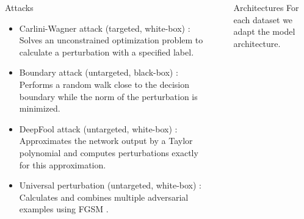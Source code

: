 \documentclass[final]{beamer}
\newlength{\sepwid}
\newlength{\onecolwid}
\newlength{\twocolwid}
\begin{document}
\begin{frame}[t]
\begin{columns}[t]
\begin{column}{\onecolwid}
			\begin{block}{Attacks}
				\begin{itemize}
					\item Carlini-Wagner attack (targeted, white-box) \cite{carlini}: Solves an unconstrained optimization problem to calculate a perturbation with a specified label.
					\item Boundary attack (untargeted, black-box) \cite{boundary}: Performs a random walk close to the
					decision boundary while the norm of the perturbation is minimized.
					\item DeepFool attack (untargeted, white-box) \cite{deepfool}: Approximates the network output by a Taylor polynomial and computes perturbations exactly for this approximation.
					\item Universal perturbation (untargeted, white-box) \cite{universal}: Calculates and combines multiple adversarial examples using FGSM \cite{fgsm}.
				\end{itemize}
			\end{block}
			
			
			
		\end{column} %
		
		\begin{column}{\sepwid}\end{column} %
		
		\begin{column}{\twocolwid} %
			
			\begin{columns}[t,totalwidth=\twocolwid] %
				
				\begin{column}{\onecolwid}\vspace{-.6in} %
					
					
					\begin{block}{Architectures}
						For each dataset we adapt the model architecture.
						\vspace{1cm}
						

\end{block}
\end{column}
\end{columns}
\end{column}
\end{columns}
\end{frame}
\end{document}
